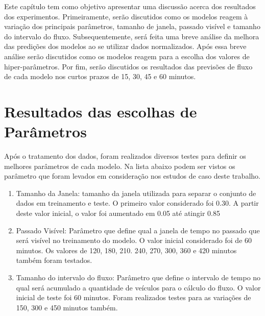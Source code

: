 





Este capítulo tem como objetivo apresentar uma discussão acerca dos resultados dos experimentos. Primeiramente, serão discutidos como os modelos reagem à variação dos principais parâmetros, tamanho de janela, passado visível e tamanho do intervalo do fluxo. Subsequentemente, será feita uma breve análise da melhora das predições dos modelos ao se utilizar dados normalizados. Após essa breve análise serão discutidos como os modelos reagem para a escolha dos valores de hiper-parâmetros. Por fim, serão discutidos os resultados das previsões de fluxo de cada modelo nos curtos prazos de 15, 30, 45 e 60 minutos.

\section{Resultados das escolhas de Parâmetros}

Após o tratamento dos dados, foram realizados diversos testes para definir os melhores parâmetros de cada modelo. Na lista abaixo podem ser vistos os parâmetro que foram levados em consideração nos estudos de caso deste trabalho.


\begin{enumerate}
	\item Tamanho da Janela: tamanho da janela utilizada para separar o conjunto de dados em treinamento e teste. O primeiro valor considerado foi 0.30. A partir deste valor inicial, o valor foi aumentado em 0.05 até atingir 0.85
	\item Passado Visível: Parâmetro que define qual a janela de tempo no passado que será visível no treinamento do modelo. O valor inicial considerado foi de 60 minutos. Os valores de 120, 180, 210. 240, 270, 300, 360 e 420 minutos também foram testados.
	\item Tamanho do intervalo do fluxo: Parâmetro que define o intervalo de tempo no qual será acumulado a quantidade de veículos para o cálculo do fluxo. O valor inicial de teste foi 60 minutos. Foram realizados testes para as variações de 150, 300 e 450 minutos também.
\end{enumerate}



